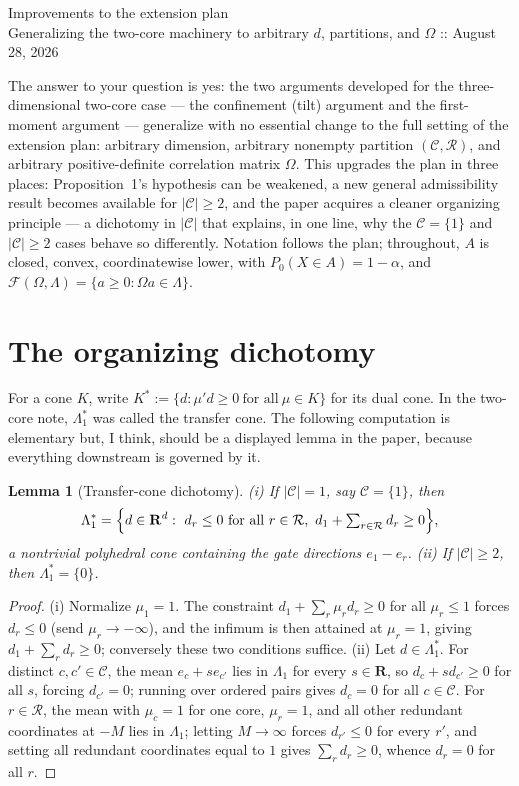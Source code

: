 \documentclass[12pt]{article}
\newtheorem{lemma}{Lemma}
\theoremstyle{remark}
\newcommand{\R}{\mathbf R}
\newcommand{\cC}{\mathcal C}
\newcommand{\cR}{\mathcal R}
\newcommand{\cF}{\mathcal F}
\begin{document}
\begin{center}
{\Large Improvements to the extension plan}\\[3pt]
{\small Generalizing the two-core machinery to arbitrary $d$, partitions, and
$\Omega$ :: August 28, 2026}
\end{center}

\medskip

The answer to your question is yes: the two arguments developed for the
three-dimensional two-core case --- the confinement (tilt) argument and the
first-moment argument --- generalize with no essential change to the full
setting of the extension plan: arbitrary dimension, arbitrary nonempty
partition $(\cC,\cR)$, and arbitrary positive-definite correlation matrix
$\Omega$. This upgrades the plan in three places: Proposition~1's hypothesis
can be weakened, a new general admissibility result becomes available for
$|\cC|\ge2$, and the paper acquires a cleaner organizing principle --- a
dichotomy in $|\cC|$ that explains, in one line, why the $\cC=\{1\}$ and
$|\cC|\ge2$ cases behave so differently. Notation follows the plan;
throughout, $A$ is closed, convex, coordinatewise lower, with
$P_0(X\in A)=1-\alpha$, and $\cF(\Omega,\Lambda)=\{a\ge0:\Omega a\in\Lambda\}$.

\section{The organizing dichotomy}

For a cone $K$, write $K^*:=\{d:\mu'd\ge0\ \text{for all}\ \mu\in K\}$ for
its dual cone. In the two-core note, $\Lambda_1^*$ was called the transfer
cone. The following computation is elementary but, I think, should be a
displayed lemma in the paper, because everything downstream is governed by
it.

\begin{lemma}[Transfer-cone dichotomy]\label{lem:dichotomy}
(i) If $|\cC|=1$, say $\cC=\{1\}$, then
\[
\Lambda_1^*
=
\Bigl\{d\in\R^d:\ d_r\le0\ \text{for all}\ r\in\cR,\
d_1+\textstyle\sum_{r\in\cR}d_r\ge0\Bigr\},
\]
a nontrivial polyhedral cone containing the gate directions
$e_1-e_r$. (ii) If $|\cC|\ge2$, then $\Lambda_1^*=\{0\}$.
\end{lemma}

\begin{proof}
(i) Normalize $\mu_1=1$. The constraint $d_1+\sum_r\mu_rd_r\ge0$ for all
$\mu_r\le1$ forces $d_r\le0$ (send $\mu_r\to-\infty$), and the infimum is
then attained at $\mu_r=1$, giving $d_1+\sum_rd_r\ge0$; conversely these two
conditions suffice. (ii) Let $d\in\Lambda_1^*$. For distinct
$c,c'\in\cC$, the mean $e_c+se_{c'}$ lies in $\Lambda_1$ for every
$s\in\R$, so $d_c+sd_{c'}\ge0$ for all $s$, forcing $d_{c'}=0$; running over
ordered pairs gives $d_c=0$ for all $c\in\cC$. For $r\in\cR$, the mean with
$\mu_c=1$ for one core, $\mu_r=1$, and all other redundant coordinates at
$-M$ lies in $\Lambda_1$; letting $M\to\infty$ forces $d_{r'}\le0$ for
every $r'$, and setting all redundant coordinates equal to $1$ gives
$\sum_rd_r\ge0$, whence $d_r=0$ for all $r$.
\end{proof}
\end{document}
